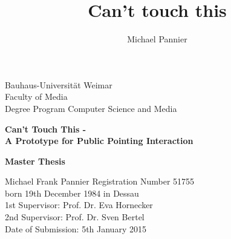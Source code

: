 
\begin{titlepage}
\large
\noindent
Bauhaus-Universität Weimar\\
Faculty of Media\\
Degree Program Computer Science and Media\\
\author{Michael Pannier}
\title{Can't touch this}
\vspace{20mm}
\begin{center}
    \huge{\bfseries{Can't Touch This -\\
		A Prototype for Public Pointing Interaction}}
\end{center}
\vspace{15mm}
\begin{center}
    \huge{\bfseries{Master Thesis}}\\
\end{center}
\vspace{20mm}
Michael Frank Pannier
\hfill Registration Number 51755\\
born 19th December 1984 in Dessau\\
\newline
\newline
1st Supervisor: Prof. Dr. Eva Hornecker\\
2nd Supervisor: Prof. Dr. Sven Bertel\\
\vfil
\noindent
Date of Submission: 5th January 2015\\
\end{titlepage}
